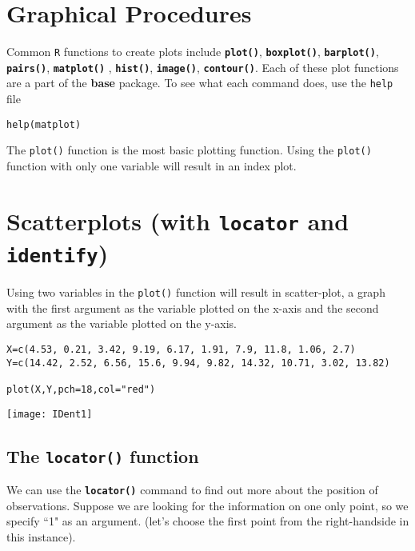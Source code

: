 
\section{Graphical Procedures}

Common \texttt{R} functions to create plots include \texttt{\textbf{plot()}}, \texttt{\textbf{boxplot()}}, \texttt{\textbf{barplot()}}, \texttt{\textbf{pairs()}}, \texttt{\textbf{matplot()}} , \texttt{\textbf{hist()}}, \texttt{\textbf{image()}}, \texttt{\textbf{contour()}}. Each of these plot functions are a part of the \textbf{base} package. To see what each command does, use the \texttt{help} file

\begin{framed}
\begin{verbatim}
help(matplot)
\end{verbatim}
\end{framed}

\noindent The \texttt{plot()} function is the most basic plotting function. Using the \texttt{plot()} function with only one variable will result in an index plot. 


 

\section{Scatterplots (with \texttt{locator} and \texttt{identify})}
\noindent Using two variables in the \texttt{plot()} function will result in scatter-plot, a graph with the first argument as the variable plotted on the x-axis and the second argument as the variable plotted on the y-axis.
\begin{framed}
\begin{verbatim}
X=c(4.53, 0.21, 3.42, 9.19, 6.17, 1.91, 7.9, 11.8, 1.06, 2.7)
Y=c(14.42, 2.52, 6.56, 15.6, 9.94, 9.82, 14.32, 10.71, 3.02, 13.82)

plot(X,Y,pch=18,col="red")
\end{verbatim}
\end{framed}


\begin{center}
\texttt{[image: IDent1]}
\end{center}

\subsection{The \texttt{locator()} function}
We can use the  \texttt{\textbf{locator()}} command to find out more about the position of observations. Suppose we are looking for the information on one only point, so we specify ``1" as an argument. (let's choose the first point from the right-handside in this instance).


